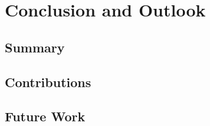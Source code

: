 \chapter{Conclusion and Outlook}
\label{chap:Conclusion}

\section{Summary}

\section{Contributions}

\section{Future Work}
